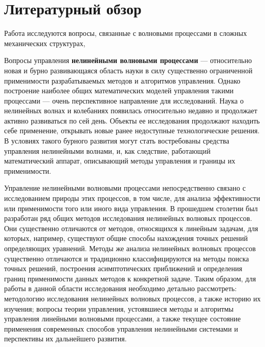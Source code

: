 \chapter{Литературный обзор}


Работа исследуются вопросы, связанные с волновыми процессами в сложных механических структурах,

Вопросы управления \textbf{нелинейными волновыми процессами} --- относительно новая и бурно развивающаяся область науки в силу существенно ограниченной применимости разрабатываемых методов и алгоритмов управления. Однако построение наиболее общих математических моделей управления такими процессами --- очень перспективное направление для исследований. Наука о нелинейных волнах и колебаниях появилась относительно недавно и продолжает активно развиваться по сей день. Объекты ее исследования продолжают находить себе применение, открывать новые ранее недоступные технологические решения. В условиях такого бурного развития могут стать востребованы средства управления нелинейными волнами, и, как следствие, работающий математический аппарат, описывающий методы управления и границы их применимости.

Управление нелинейными волновыми процессами непосредственно связано с исследованием природы этих процессов, в том числе, для анализа эффективности или применимости того или иного вида управления. В прошедшем столетии был разработан ряд общих методов исследования нелинейных волновых процессов. Они существенно отличаются от методов, относящихся к линейным задачам, для которых, например, существуют общие способы нахождения точных решений определяющих уравнений. Методы же анализа нелинейных волновых процессов существенно отличаются и традиционно классифицируются на методы поиска точных решений, построения асимптотических приближений и определения границ применимости данных методов к конкретной задаче. Таким образом, для работы в данной области исследования необходимо детально рассмотреть: методологию исследования нелинейных волновых процессов, а также историю их изучения; вопросы теории управления, устоявшиеся методы и алгоритмы управления линейными волновыми процессами, а также текущее состояние применения современных способов управления нелинейными системами и перспективы их дальнейшего развития.


